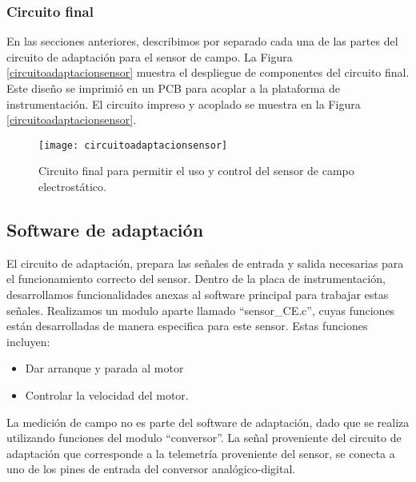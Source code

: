 
\subsubsection{Circuito final} %
\label{it6:ssub:circuito_final}

En las secciones anteriores, describimos por separado cada una de las partes del circuito de adaptación para el sensor de campo. La Figura \ref{circuitoadaptacionsensor} muestra el despliegue de componentes del circuito final. Este diseño se imprimió en un PCB para acoplar a la plataforma de instrumentación. El circuito impreso y acoplado se muestra en la Figura \ref{circuitoadaptacionsensor}.

\begin{figure}[h]
  \centering
  \texttt{[image: circuitoadaptacionsensor]}
  \caption{Circuito final para permitir el uso y control del sensor de campo electrostático.}\label{fig:circuitoadaptacionsensor}
\end{figure}





\subsection{Software de adaptación} %
\label{it6:sec:software_de_adaptacion}


El circuito de adaptación, prepara las señales de entrada y salida necesarias para el funcionamiento correcto del sensor. Dentro de la placa de instrumentación, desarrollamos funcionalidades anexas al software principal para trabajar estas señales.
Realizamos un modulo aparte llamado ``sensor\_CE.c'', cuyas funciones están desarrolladas de manera especifica para este sensor. Estas funciones incluyen:

\begin{itemize}
  \item Dar arranque y parada al motor
  \item Controlar la velocidad del motor.
\end{itemize}

La medición de campo no es parte del software de adaptación, dado que se realiza utilizando funciones del modulo ``conversor''. La señal proveniente del circuito de adaptación que corresponde a la telemetría proveniente del sensor, se conecta a uno de los pines de entrada del conversor analógico-digital. \\

